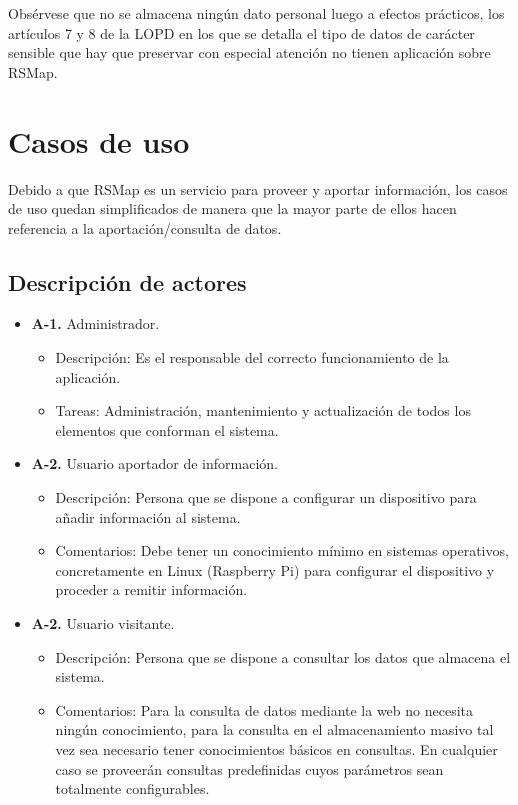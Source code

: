 Obsérvese que no se almacena ningún dato personal luego a efectos prácticos, los artículos 7 y 8 de la LOPD en los que se detalla el tipo de datos de carácter sensible que hay que preservar con especial atención no tienen aplicación sobre RSMap.


\newpage

\section{Casos de uso}

Debido a que RSMap es un servicio para proveer y aportar información, los casos de uso quedan simplificados de manera que la mayor parte de ellos hacen referencia a la aportación/consulta de datos.

\subsection{Descripción de actores}

\begin{itemize}
  \item \textbf{A-1.} Administrador.
  \begin{itemize}
   \item Descripción: Es el responsable del correcto funcionamiento de la aplicación.
   \item Tareas: Administración, mantenimiento y actualización de todos los elementos que conforman el sistema.
  \end{itemize}

  \item \textbf{A-2.} Usuario aportador de información.
  \begin{itemize}
   \item Descripción: Persona que se dispone a configurar un dispositivo para añadir información al sistema.
   \item Comentarios: Debe tener un conocimiento mínimo en sistemas operativos, concretamente en Linux (Raspberry Pi) para configurar el dispositivo y proceder a remitir información.
  \end{itemize}

  \item \textbf{A-2.} Usuario visitante.
  \begin{itemize}
   \item Descripción: Persona que se dispone a consultar los datos que almacena el sistema.
   \item Comentarios: Para la consulta de datos mediante la web no necesita ningún conocimiento, para la consulta en el almacenamiento masivo tal vez sea necesario tener conocimientos básicos en consultas. En cualquier caso se proveerán consultas predefinidas cuyos parámetros sean totalmente configurables.
  \end{itemize}
\end{itemize}

